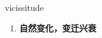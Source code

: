 
\begin{frame}
{\huge vicissitude}
\begin{center}
\begin{enumerate}\Large
  \item \textbf{自然变化，变迁兴衰}
\end{enumerate}
\end{center}
\end{frame}
